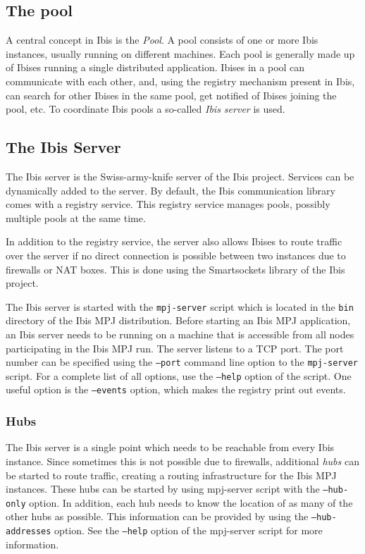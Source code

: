 \documentclass[a4paper,10pt]{article}
\begin{document}
\subsection{The pool}

A central concept in Ibis is the \emph{Pool}. A pool consists of one or
more Ibis instances, usually running on different machines. Each pool is
generally made up of Ibises running a single distributed application.
Ibises in a pool can communicate with each other, and, using the
registry mechanism present in Ibis, can search for other Ibises in the
same pool, get notified of Ibises joining the pool, etc. To
coordinate Ibis pools a so-called \emph{Ibis server} is used.

\subsection{The Ibis Server}

The Ibis server is the Swiss-army-knife server of the Ibis project.
Services can be dynamically added to the server. By default, the Ibis
communication library comes with a registry service. This registry
service manages pools, possibly multiple pools at the same time.

In addition to the registry service, the server also allows
Ibises to route traffic over the server if no direct connection is
possible between two instances due to firewalls or NAT boxes. This is
done using the Smartsockets library of the Ibis project.

The Ibis server is started with the \texttt{mpj-server} script which is
located in the \texttt{bin} directory of the Ibis MPJ distribution.  Before
starting an Ibis MPJ application, an Ibis server needs to be running on a
machine that is accessible from all nodes participating in the Ibis MPJ run.
The server listens to a TCP port. The port number can be specified using
the \texttt{--port} command line option to the \texttt{mpj-server}
script.  For a complete list of all options, use the \texttt{--help}
option of the script. One useful option is the  \texttt{--events}
option, which makes the registry print out events.

\subsubsection{Hubs}
\label{hubs}

The Ibis server is a single point which needs to be reachable from every
Ibis instance. Since sometimes this is not possible due to firewalls,
additional \emph{hubs} can be started to route traffic, creating a
routing infrastructure for the Ibis MPJ instances. These hubs can be started
by using mpj-server script with the \texttt{--hub-only} option. In
addition, each hub needs to know the location of as many of the other
hubs as possible. This information can be provided by using the
\texttt{--hub-addresses} option. See the \texttt{--help} option of the
mpj-server script for more information.
\end{document}
